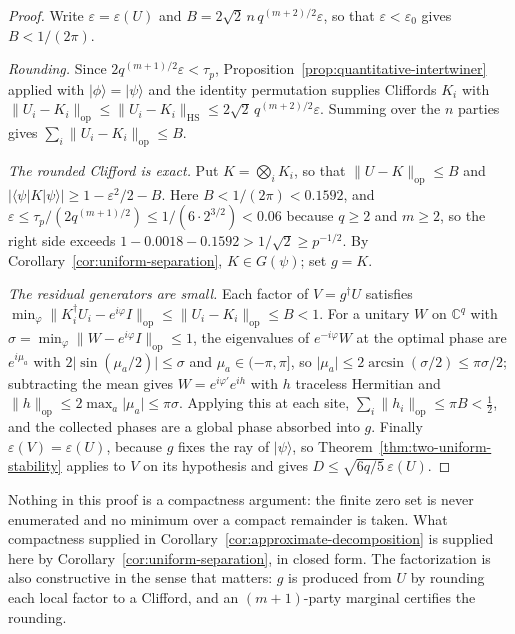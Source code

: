 \begin{proof}
Write \(\varepsilon=\varepsilon(U)\) and
\(B=2\sqrt2\,n\,q^{(m+2)/2}\varepsilon\), so that
\(\varepsilon<\varepsilon_0\) gives \(B<1/(2\pi)\).

\emph{Rounding.}  Since \(2q^{(m+1)/2}\varepsilon<\tau_p\),
Proposition~\ref{prop:quantitative-intertwiner} applied with
\(\lvert\phi\rangle=\lvert\psi\rangle\) and the identity permutation
supplies Cliffords \(K_i\) with
\(\lVert U_i-K_i\rVert_{\mathrm{op}}\leq
\lVert U_i-K_i\rVert_{\mathrm{HS}}\leq2\sqrt2\,q^{(m+2)/2}\varepsilon\).
Summing over the \(n\) parties gives
\(\sum_i\lVert U_i-K_i\rVert_{\mathrm{op}}\leq B\).

\emph{The rounded Clifford is exact.}  Put \(K=\bigotimes_iK_i\), so that
\(\lVert U-K\rVert_{\mathrm{op}}\leq B\) and
\(\lvert\langle\psi\rvert K\lvert\psi\rangle\rvert\geq
1-\varepsilon^2/2-B\).  Here \(B<1/(2\pi)<0.1592\), and
\(\varepsilon\leq\tau_p/(2q^{(m+1)/2})\leq1/(6\cdot2^{3/2})<0.06\) because
\(q\geq2\) and \(m\geq2\), so the right side exceeds
\(1-0.0018-0.1592>1/\sqrt2\geq p^{-1/2}\).  By
Corollary~\ref{cor:uniform-separation}, \(K\in G(\psi)\); set \(g=K\).

\emph{The residual generators are small.}  Each factor of
\(V=g^\dagger U\) satisfies
\(\min_\varphi\lVert K_i^\dagger U_i-e^{i\varphi}I\rVert_{\mathrm{op}}
\leq\lVert U_i-K_i\rVert_{\mathrm{op}}\leq B<1\).  For a unitary \(W\) on
\(\mathbb C^q\) with
\(\sigma=\min_\varphi\lVert W-e^{i\varphi}I\rVert_{\mathrm{op}}\leq1\), the
eigenvalues of \(e^{-i\varphi}W\) at the optimal phase are \(e^{i\mu_a}\)
with \(2\lvert\sin(\mu_a/2)\rvert\leq\sigma\) and
\(\mu_a\in(-\pi,\pi]\), so
\(\lvert\mu_a\rvert\leq2\arcsin(\sigma/2)\leq\pi\sigma/2\); subtracting the
mean gives \(W=e^{i\varphi'}e^{ih}\) with \(h\) traceless Hermitian and
\(\lVert h\rVert_{\mathrm{op}}\leq2\max_a\lvert\mu_a\rvert\leq\pi\sigma\).
Applying this at each site,
\(\sum_i\lVert h_i\rVert_{\mathrm{op}}\leq\pi B<\frac12\), and the
collected phases are a global phase absorbed into \(g\).  Finally
\(\varepsilon(V)=\varepsilon(U)\), because \(g\) fixes the ray of
\(\lvert\psi\rangle\), so Theorem~\ref{thm:two-uniform-stability} applies
to \(V\) on its hypothesis and gives
\(D\leq\sqrt{6q/5}\,\varepsilon(U)\).
\end{proof}

Nothing in this proof is a compactness argument: the finite zero set is
never enumerated and no minimum over a compact remainder is taken.  What
compactness supplied in Corollary~\ref{cor:approximate-decomposition} is
supplied here by Corollary~\ref{cor:uniform-separation}, in closed form.
The factorization is also constructive in the sense that matters: \(g\) is
produced from \(U\) by rounding each local factor to a Clifford, and an
\((m+1)\)-party marginal certifies the rounding.

